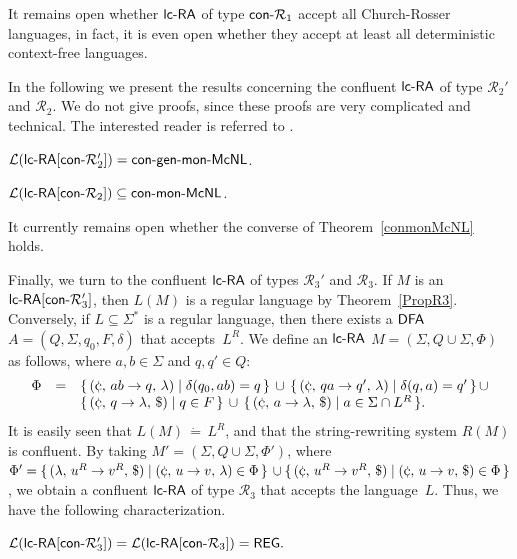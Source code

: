 It remains open whether $\lcRA$ of type $\textup{\sf con-}\mathcal{R}_1$ accept all Church-Rosser languages, in fact, it is even open whether they accept at least all deterministic context-free languages.

In the following we present the results concerning the confluent $\lcRA$ of type $\mathcal{R}_2'$ and $\mathcal{R}_2$. We do not give proofs, since these proofs are very complicated and technical. The interested reader is referred to \cite{OCM13}.

\begin{theorem}\label{congenmonMcNL}
$\mathcal{L}(\textup{\sf lc-RA$[\textup{\sf con-}\mathcal{R}_2']$}) = \textup{\sf con-gen-mon-McNL}$.
\end{theorem}
%
\begin{theorem}\label{conmonMcNL}
$\mathcal{L}(\textup{\sf lc-RA$[\textup{\sf con-}\mathcal{R}_2]$}) \subseteq \textup{\sf con-mon-McNL}$.
\end{theorem}

It currently remains open whether the converse of Theorem~\ref{conmonMcNL} holds.

Finally, we turn to the confluent $\lcRA$ of types  $\mathcal{R}_3'$ and $\mathcal{R}_3$. If $M$ is an $\textup{\sf lc-RA$[\textup{\sf con-}\mathcal{R}_3']$}$, then $L(M)$ is a regular language by Theorem~\ref{PropR3}. Conversely, if $L\subseteq\Sigma^*$ is a regular language, then there exists a $\textup{\sf DFA}$ $A=(Q,\Sigma,q_0,F,\delta)$ that accepts~$L^R$. We define an $\lcRA$ $M=(\Sigma,Q\cup\Sigma,\Phi)$ as follows, where $a,b\in\Sigma$ and $q,q'\in Q$:
$$\begin{array}{ccl}
\Phi & = & \{\,\rarule{\cent}{ab}{q}{\lambda}  \mid  \delta(q_0,ab)=q\,\}
      \,  \cup \,  \{\,\rarule{\cent}{qa}{q'}{\lambda}  \mid  \delta(q,a)=q'\,\} \,\cup \\
     &   & \{\,\rarule{\cent}{q}{\lambda}{\$}  \mid  q\in F\,\}
      \, \cup  \, \{\,\rarule{\cent}{a}{\lambda}{\$}  \mid a\in \Sigma\cap L^R\,\}.
\end{array}$$
It is easily seen that $L(M)\,\dot{=}\,L^R$, and that the string-rewriting system $R(M)$ is confluent. By taking $M'=(\Sigma,Q\cup\Sigma,\Phi')$, where
$\Phi' = \{\,\rarule{\lambda}{u^R}{v^R}{\$} \mid \rarule{\cent}{u}{v}{\lambda}\in \Phi\,\} 
         \,\cup
         \{\,\rarule{\cent}{u^R}{v^R}{\$} \mid \rarule{\cent}{u}{v}{\$}\in \Phi\,\}$,
we obtain a confluent $\lcRA$ of type $\mathcal{R}_3$ that accepts the language~$L$. Thus, we have the following characterization.
%
\begin{theorem}\label{PropConR3}
${\mathcal L}(\textup{\sf lc-RA$[\textup{\sf con-}\mathcal{R}_3']$}) = {\mathcal L}(\textup{\sf lc-RA$[\textup{\sf con-}\mathcal{R}_3]$}) = \textup{\sf REG}.$
\end{theorem}

